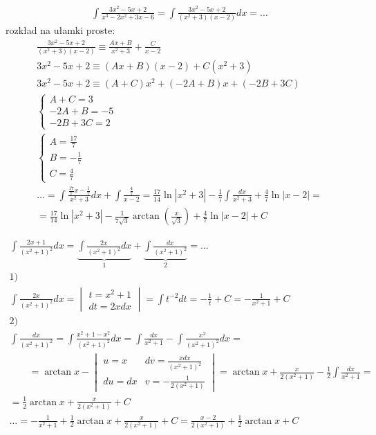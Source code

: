 
\begin{gather*}\int \frac{3x^2-5x+2}{x^3-2x^2+3x-6} =\int \frac{3x^2-5x+2}{(x^2+3)(x-2)}dx=\ldots\end{gather*}
rozkład na ułamki proste:
\begin{gather*}\frac{3x^2-5x+2}{(x^2+3)(x-2)} \equiv \frac{Ax+B}{x^2+3}+\frac{C}{x-2} \\
3x^2-5x+2 \equiv (Ax+B)(x-2)+C(x^2+3) \\
3x^2-5x+2 \equiv (A+C)x^2+(-2A+B)x+(-2B+3C) \\
\begin{cases} A+C=3 \\ -2A+B=-5 \\ -2B+3C=2 \end{cases} \\
\begin{cases} A=\frac{17}{7} \\ B=-\frac{1}{7} \\ C=\frac{4}{7} \end{cases} \\
\ldots = \int \frac{\frac{17}{7}x-\frac{1}{7}}{x^2+3}dx+\int \frac{\frac{4}{7}}{x-2} = \frac{17}{14}\ln|x^2+3|-\frac{1}{7}\int \frac{dx}{x^2+3}+\frac{4}{7}\ln|x-2|= \\
= \frac{17}{14}\ln|x^2+3|-\frac{1}{7\sqrt{3}}\arctan \left( \frac{x}{\sqrt{3}}\right)+\frac{4}{7}\ln|x-2|+C\end{gather*}



\begin{gather*}\int \frac{2x+1}{(x^2+1)^2}dx = \underbrace{\int \frac{2x}{(x^2+1)^2}dx}_{1} + \underbrace{\int \frac{dx}{(x^2+1)^2}}_{2}=\ldots\\
1)\\
 \int \frac{2x}{(x^2+1)^2}dx = \begin{vmatrix}t=x^2+1 \\ dt=2xdx \end{vmatrix} = \int t^{-2}dt = -\frac{1}{t}+C = -\frac{1}{x^2+1}+C\\
2) \\
\int \frac{dx}{(x^2+1)^2} = \int \frac{x^2+1-x^2}{(x^2+1)^2}dx = \int \frac{dx}{x^2+1} - \int \frac{x^2}{(x^2+1)^2}dx = \\
\qquad = \arctan x - \begin{vmatrix}
u=x & dv=\frac{xdx}{(x^2+1)^2} \\
du=dx & v=-\frac{1}{2(x^2+1)}
\end{vmatrix} = \arctan x + \frac{x}{2(x^2+1)} - \frac{1}{2} \int \frac{dx}{x^2+1} = \\
= \frac{1}{2}\arctan x + \frac{x}{2(x^2+1)}+C\\
\ldots = -\frac{1}{x^2+1}+\frac{1}{2}\arctan x + \frac{x}{2(x^2+1)}+C = \frac{x-2}{2(x^2+1)}+\frac{1}{2}\arctan x +C\end{gather*}


